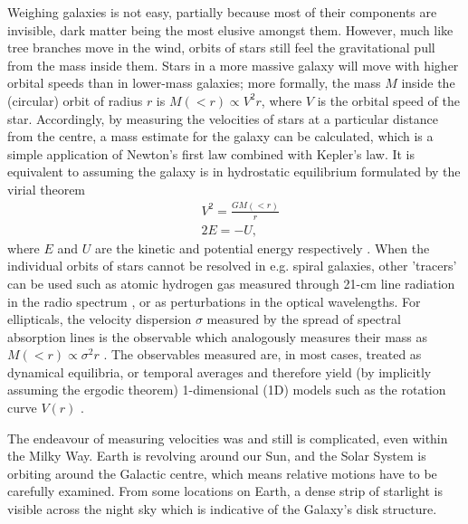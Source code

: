 
Weighing galaxies is not easy, partially because most of their components are
invisible, dark matter being the most elusive amongst them.  However, much like
tree branches move in the wind, orbits of stars still feel the gravitational
pull from the mass inside them.  Stars in a more massive galaxy will move with
higher orbital speeds than in lower-mass galaxies; more formally, the mass $M$
inside the (circular) orbit of radius $r$ is $M(<r) \propto V^{2}r$, where $V$
is the orbital speed of the star.  Accordingly, by measuring the velocities of
stars at a particular distance from the centre, a mass estimate for the galaxy
can be calculated, which is a simple application of Newton's first law combined
with Kepler's law.  It is equivalent to assuming the galaxy is in hydrostatic
equilibrium formulated by the virial theorem 
\begin{equation}
    \begin{aligned}
        &V^{2} = \frac{GM(<r)}{r}\\
        &2E = -U,
    \end{aligned}
\end{equation}
where $E$ and $U$ are the kinetic and potential energy respectively
.  When the individual orbits of stars
cannot be resolved in {e.g.} spiral galaxies, other 'tracers' can be used such
as atomic hydrogen gas measured through 21-cm line radiation in the radio
spectrum , or as
perturbations in the optical wavelengths.  For ellipticals, the velocity
dispersion $\sigma$ measured by the spread of spectral absorption lines is the
observable which analogously measures their mass as $M(<r) \propto \sigma^{2}r$
.  The observables measured are, in most
cases, treated as dynamical equilibria, or temporal averages and therefore yield
(by implicitly assuming the ergodic theorem) 1-dimensional (1D) models such as
the rotation curve $V(r)$ .

The endeavour of measuring velocities was and still is complicated, even within
the Milky Way.  Earth is revolving around our Sun, and the Solar System is
orbiting around the Galactic centre, which means relative motions have to be
carefully examined.  From some locations on Earth, a dense strip of starlight is
visible across the night sky which is indicative of the Galaxy's disk structure.

